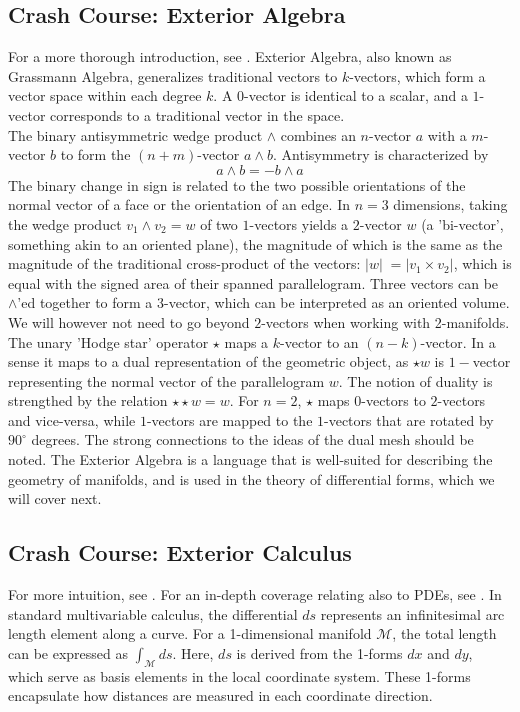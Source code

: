 \subsection*{Crash Course: Exterior Algebra}
For a more thorough introduction, see \cite{craneDDG}.
Exterior Algebra, also known as Grassmann Algebra, generalizes traditional vectors to $k$-vectors, which form a vector space within each degree $k$. A $0$-vector is identical to a scalar, and a $1$-vector corresponds to a traditional vector in the space.
\\
The binary antisymmetric wedge product $\wedge$ combines an $n$-vector $a$ with a $m$-vector $b$ to form the $(n+m)$-vector $a \wedge b$. Antisymmetry is characterized by $$a \wedge b = -b \wedge a$$
The binary change in sign is related to the two possible orientations of the normal vector of a face or the orientation of an edge. In $n=3$ dimensions, taking the wedge product $v_1 \wedge v_2 = w$ of two $1$-vectors yields a $2$-vector $w$ (a 'bi-vector', something akin to an oriented plane), the magnitude of which is the same as the magnitude of the traditional cross-product of the vectors: $|w| \;= |v_1 \times v_2|$, which is equal with the signed area of their spanned parallelogram. Three vectors can be $\wedge$'ed together to form a $3$-vector, which can be interpreted as an oriented volume. We will however not need to go beyond $2$-vectors when working with 2-manifolds.
\\
The unary 'Hodge star' operator $\star$ maps a $k$-vector to an $(n-k)$-vector. In a sense it maps to a dual representation of the geometric object, as $\star w$ is $1-$vector representing the normal vector of the parallelogram $w$. The notion of duality is strengthed by the relation $\star\star w = w$. For $n=2$, $\star$ maps $0$-vectors to $2$-vectors and vice-versa, while $1$-vectors are mapped to the $1$-vectors that are rotated by $90^\circ$ degrees. The strong connections to the ideas of the dual mesh should be noted. The Exterior Algebra is a language that is well-suited for describing the geometry of manifolds, and is used in the theory of differential forms, which we will cover next.

\subsection*{Crash Course: Exterior Calculus}
For more intuition, see \cite{craneDDG}. For an in-depth coverage relating also to PDEs, see \cite{bryant1991exterior}. In standard multivariable calculus, the differential $ds$ represents an infinitesimal arc length element along a curve. For a 1-dimensional manifold $\mathcal{M}$, the total length can be expressed as $\int_{\mathcal{M}} ds$. Here, $ds$ is derived from the 1-forms $dx$ and $dy$, which serve as basis elements in the local coordinate system. These 1-forms encapsulate how distances are measured in each coordinate direction.

